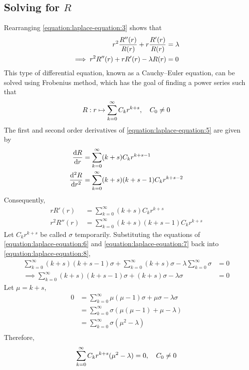 \subsection{Solving for $R$}
Rearranging \eqref{equation:laplace-equation:3} shows that
\begin{align}
   \notag r^2\frac{R''(r)}{R(r)}+r\frac{R'(r)}{R(r)}&=\lambda\\
    \label{equation:laplace-equation:8}\implies r^2R''(r)+rR'(r)-\lambda R(r)&=0
\end{align}
This type of differential equation, known as a Cauchy--Euler equation, can be solved using Frobenius method, which has the goal of finding a power series such that
\begin{equation}
    \label{equation:laplace-equation:5}R:r\mapsto\sum_{k=0}^\infty C_k r^{k+s}\qc C_0\neq0
\end{equation}
The first and second order derivatives of \eqref{equation:laplace-equation:5} are given by
\begin{align*}
    \dv{R}{r}&=\sum_{k=0}^\infty(k+s)C_k r^{k+s-1}\\
    \dv[2]{R}{r}&=\sum_{k=0}^\infty(k+s)(k+s-1)C_k r^{k+s-2}
\end{align*}
Consequently,
\begin{align}
    \label{equation:laplace-equation:6}rR'(r)&=\sum_{k=0}^\infty(k+s)C_k r^{k+s}\\
    \label{equation:laplace-equation:7}r^2R''(r)&=\sum_{k=0}^\infty(k+s)(k+s-1)C_k r^{k+s}
\end{align}
Let $C_k r^{k+s}$ be called $\sigma$ temporarily. Substituting the equations of \eqref{equation:laplace-equation:6} and
\eqref{equation:laplace-equation:7} back into \eqref{equation:laplace-equation:8},
\begin{align*}
    \sum_{k=0}^\infty(k+s)(k+s-1)\sigma+\sum_{k=0}^\infty(k+s)\sigma-\lambda\sum_{k=0}^\infty\sigma&=0\\
    \implies\sum_{k=0}^\infty(k+s)(k+s-1)\sigma+(k+s)\sigma-\lambda\sigma&=0
\end{align*}
Let $\mu=k+s$,
\begin{align*}
    0&=\sum_{k=0}^\infty\mu(\mu-1)\sigma+\mu\sigma-\lambda\sigma\\
    &=\sum_{k=0}^\infty\sigma\left(\mu(\mu-1)+\mu-\lambda\right)\\
    &=\sum_{k=0}^\infty\sigma\left(\mu^2-\lambda\right)\\
\end{align*}
Therefore,
$$
    \sum_{k=0}^\infty C_k r^{k+s}(\mu^2-\lambda)=0\qc C_0\neq0
$$
